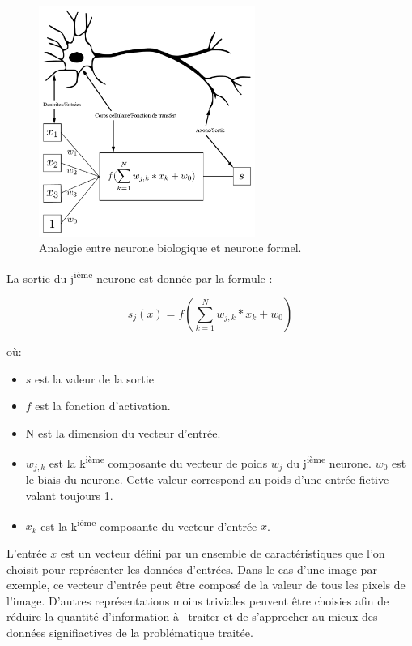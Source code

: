 \documentclass[a4paper,twoside]{report}
\begin{document}
\begin{figure}
\begin{center}
\includegraphics[width=200pt]{Images/neurone-01.png}
\end{center}
\caption{Analogie entre neurone biologique et neurone formel.}
\end{figure}

La sortie du j\textsuperscript{ième} neurone est donnée par la formule :

\begin{equation}\label{eqNeur}s_{j}(x)=f(\sum_{k=1}^{N} w_{j,k}*x_{k}+w_{0})\end{equation}

où:

\begin{itemize}
  \item $s$ est la valeur de la sortie
  \item $f$ est la fonction d'activation.
  \item N est la dimension du vecteur d'entrée.
  \item $w_{j,k}$ est la k\textsuperscript{ième} composante du vecteur de poids $w_{j}$ du j\textsuperscript{ième} neurone. $w_{0}$ est le biais du neurone. Cette valeur correspond au poids d'une entrée fictive valant toujours 1.
  \item $x_{k}$ est la k\textsuperscript{ième} composante du vecteur d'entrée $x$.\\
\end{itemize}

L'entrée $x$ est un vecteur défini par un ensemble de caractéristiques que l'on choisit pour représenter les données d'entrées. Dans le cas d'une image par exemple, ce vecteur d'entrée peut être composé de la valeur de tous les pixels de l'image. D'autres représentations moins triviales peuvent être choisies afin de réduire la quantité d'information à  traiter et de s'approcher au mieux des données signifiactives de la problématique traitée.\\
\end{document}
